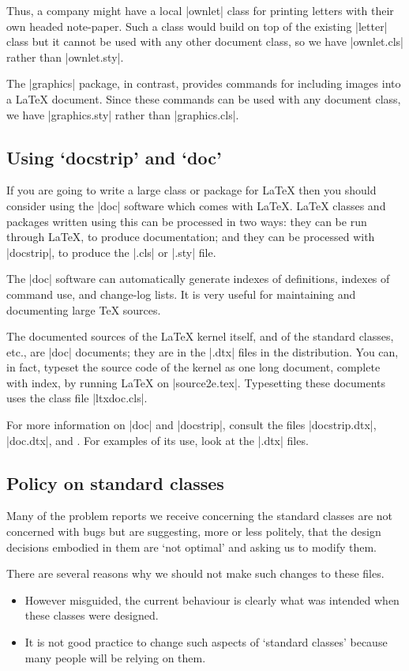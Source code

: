 \documentclass{ltxguide}
\begin{document}
Thus, a company might have a local |ownlet| class for printing letters
with their own headed note-paper.  Such a class would build on top of
the existing |letter| class but it cannot be used with any other
document class, so we have |ownlet.cls| rather than |ownlet.sty|.

The |graphics| package, in contrast, provides commands for including
images into a \LaTeX{} document.  Since these commands can be used
with any document class, we have |graphics.sty| rather than
|graphics.cls|.

\subsection{Using `docstrip' and `doc'}

If you are going to write a large class or package for \LaTeX{} then
you should consider using the |doc| software which comes with
\LaTeX{}.
\LaTeX{} classes and packages written using this can be
processed in two ways: they can be run through \LaTeX{}, to produce
documentation; and they can be processed with |docstrip|, to produce
the |.cls| or |.sty| file.

The |doc| software can automatically generate indexes of definitions,
indexes of command use, and change-log lists.  It is very useful for
maintaining and documenting large \TeX{} sources.

The documented sources of the \LaTeX{} kernel itself, and of the
standard classes, etc., are |doc| documents; they are in the |.dtx|
files in the distribution.  You can, in fact, typeset the source code
of the kernel as one long document, complete with index, by running
\LaTeX{} on |source2e.tex|.  Typesetting these documents uses the
class file |ltxdoc.cls|.

For more information on |doc| and |docstrip|, consult the files
|docstrip.dtx|, |doc.dtx|, and \emph{\LaTeXcomp}.  For examples of its
use, look at the |.dtx| files.

\subsection{Policy on standard classes}

Many of the problem reports we receive concerning the standard classes
are not concerned with bugs but are suggesting, more or less politely,
that the design decisions embodied in them are `not optimal' and
asking us to modify them.

There are several reasons why we should not make such changes to these
files.
\begin{itemize}
\item
  However misguided, the current behaviour is clearly what was
  intended when these classes were designed.
\item
  It is not good practice to change such aspects of `standard classes'
  because many people will be relying on them.
\end{itemize}
\end{document}
